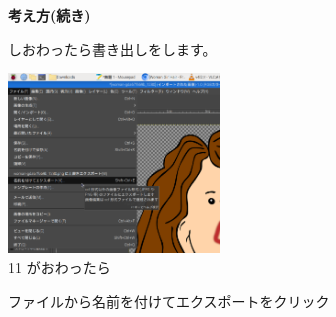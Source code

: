 \begin{figure}
  \textbf{考え方(続き)}


  しおわったら書き出しをします。

  \centering
  \begin{minipage}{\textwidth}
    \includegraphics[width=0.5\textwidth]{text01-img/textbook-img138.png}\\
    11 がおわったら

    ファイルから名前を付けてエクスポートをクリック
  \end{minipage}

  \bigskip



\end{figure}
